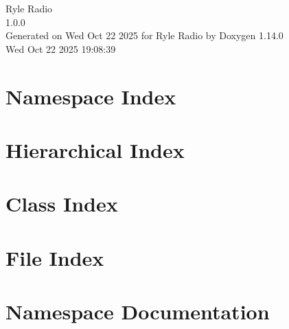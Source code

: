 \documentclass[twoside]{book}
\newcommand{\+}{\discretionary{\mbox{\scriptsize$\hookleftarrow$}}{}{}}
\newcommand{\clearemptydoublepage}{%
    \newpage{\pagestyle{empty}\cleardoublepage}%
  }
\begin{document}
  \raggedbottom
    \hypersetup{pageanchor=false,
                bookmarksnumbered=true,
                pdfencoding=unicode
               }
  \begin{titlepage}
  \vspace*{7cm}
  \begin{center}%
  {\Large Ryle Radio}\\
  [1ex]\large 1.\+0.\+0 \\
  \vspace*{1cm}
  {\large Generated on Wed Oct 22 2025 for Ryle Radio by Doxygen 1.14.0}\\
    \vspace*{0.5cm}
    {\small Wed Oct 22 2025 19:08:39}
  \end{center}
  \end{titlepage}
  \clearemptydoublepage
  \tableofcontents
  \clearemptydoublepage
  \hypersetup{pageanchor=true}
\chapter{Namespace Index}

\chapter{Hierarchical Index}

\chapter{Class Index}

\chapter{File Index}

\chapter{Namespace Documentation}





\end{document}
